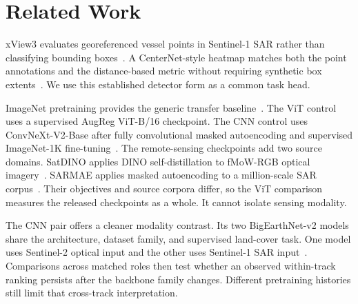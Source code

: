 \section{Related Work}

xView3 evaluates georeferenced vessel points in Sentinel-1 SAR rather than
classifying bounding boxes~\cite{paolo2022xview3}. A CenterNet-style heatmap
matches both the point annotations and the distance-based metric without
requiring synthetic box extents~\cite{zhou2019objects}. We use this
established detector form as a common task head.

ImageNet pretraining provides the generic transfer
baseline~\cite{steiner2021trainvit}. The ViT control uses a supervised AugReg
ViT-B/16 checkpoint. The CNN control uses ConvNeXt-V2-Base after fully
convolutional masked autoencoding and supervised ImageNet-1K
fine-tuning~\cite{woo2023convnextv2}. The remote-sensing checkpoints add two
source domains. SatDINO applies DINO self-distillation to fMoW-RGB optical
imagery~\cite{straka2025satdino}. SARMAE applies masked autoencoding to a
million-scale SAR corpus~\cite{liu2026sarmae}. Their objectives and source
corpora differ, so the ViT comparison measures the released checkpoints as
a whole. It cannot isolate sensing modality.

The CNN pair offers a cleaner modality contrast. Its two BigEarthNet-v2
models share the architecture, dataset family, and supervised land-cover
task. One model uses Sentinel-2 optical input and the other uses Sentinel-1
SAR input~\cite{sumbul2019bigearthnet,clasen2025reben}. Comparisons across
matched roles then test whether an observed within-track ranking persists
after the backbone family changes. Different pretraining histories still
limit that cross-track interpretation.
